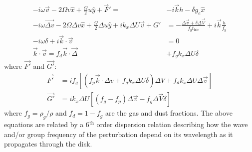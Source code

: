 \documentclass[12pt]{article}
\begin{document}
\begin{align}
    \label{eq:perturbstart}
    -i\omega\vec{v} -2\Omega v \hat x + \frac{\Omega}{2}u\hat y + \vec{F}' =& -i\vec{k}h - \delta g_e \hat x \\
    -i\omega\vec{\Delta v} - 2\Omega\Delta v \hat x + \frac{\Omega}{2}\Delta u\hat y + ik_x\Delta U \vec{v} + G' &= -\frac{\Delta \vec{v}+\delta \Delta\vec{V}}{f_gt_\mathrm{fric}} + i\vec{k}\frac{h}{f_g} \\
    -i\omega \delta + i\vec{k}\cdot\vec{v} &= 0 \\
    \vec{k}\cdot\vec{v} = f_d\vec{k}\cdot\vec{\Delta}& + f_gk_x\Delta U\delta
\end{align}
where $\vec{F'}$ and $\vec{G'}$:
\begin{align}
    \vec{F'} &= if_g\left[(f_p\vec{k}\cdot\Delta v + f_gk_x\Delta U\delta)\Delta V + f_dk_x\Delta U\Delta\vec{v}\right] \\ 
    \vec{G'} &= ik_x\Delta U\left[(f_g-f_p)\Delta\vec{v} - f_g\Delta\vec{V}\delta\right]
    \label{eq:perturbend}
\end{align}
where $f_g=\rho_g/\rho$ and $f_d=1-f_g$ are the gas and dust fractions. The above equations are related by a 6$^{\mathrm{th}}$ order dispersion relation describing how the wave and/or group frequency of the perturbation depend on its wavelength as it propagates through the disk. 
\end{document}
